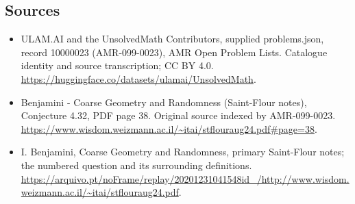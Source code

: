 \documentclass[11pt,a4paper]{article}
\begin{document}
\subsection{Sources}
\begin{itemize}
\item[S1] ULAM.AI and the UnsolvedMath Contributors, supplied problems.json, record 10000023 (AMR-099-0023), AMR Open Problem Lists. Catalogue identity and source transcription; CC BY 4.0.
\url{https://huggingface.co/datasets/ulamai/UnsolvedMath}.
\item[S2] Benjamini - Coarse Geometry and Randomness (Saint-Flour notes), Conjecture 4.32, PDF page 38. Original source indexed by AMR-099-0023.
\url{https://www.wisdom.weizmann.ac.il/~itai/stflouraug24.pdf#page=38}.
\item[S3] I. Benjamini, Coarse Geometry and Randomness, primary Saint-Flour notes; the numbered question and its surrounding definitions.
\url{https://arquivo.pt/noFrame/replay/20201231041548id_/http://www.wisdom.weizmann.ac.il/~itai/stflouraug24.pdf}.
\end{itemize}
\end{document}
